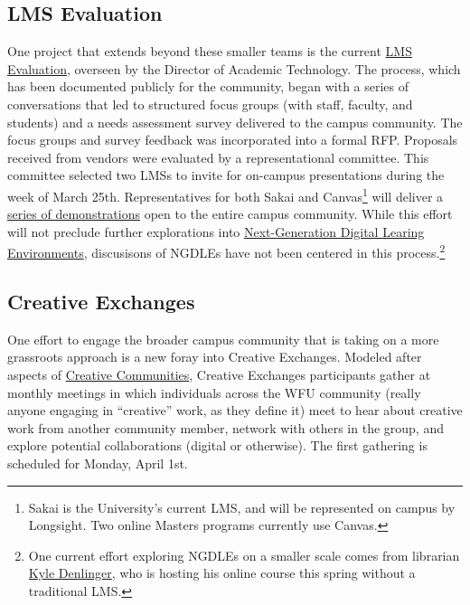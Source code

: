 \documentclass[]{tufte-handout}
\begin{document}
\subsection{LMS Evaluation}\label{lms-evaluation}

One project that extends beyond these smaller teams is the current
\href{https://is.wfu.edu/academic-technologies/lms-review/}{LMS
Evaluation}, overseen by the Director of Academic Technology. The
process, which has been documented publicly for the community, began
with a series of conversations that led to structured focus groups (with
staff, faculty, and students) and a needs assessment survey delivered to
the campus community. The focus groups and survey feedback was
incorporated into a formal RFP. Proposals received from vendors were
evaluated by a representational committee. This committee selected two
LMSs to invite for on-campus presentations during the week of March
25th. Representatives for both Sakai and Canvas\footnote{Sakai is the
  University's current LMS, and will be represented on campus by
  Longsight. Two online Masters programs currently use Canvas.} will
deliver a
\href{https://us18.campaign-archive.com/?e=\&u=bea1d79e7a99dd4ba1507c539\&id=dd32f72c28}{series
of demonstrations} open to the entire campus community. While this
effort will not preclude further explorations into
\href{https://er.educause.edu/articles/2017/7/the-ngdle-we-are-the-architects}{Next-Generation
Digital Learing Environments}, discusisons of NGDLEs have not been
centered in this process.\footnote{One current effort exploring NGDLEs
  on a smaller scale comes from librarian
  \href{https://zsr.wfu.edu/directory/kyle-denlinger/}{Kyle Denlinger},
  who is hosting his online course this spring without a traditional
  LMS.}

\subsection{Creative Exchanges}\label{creative-exchanges}

One effort to engage the broader campus community that is taking on a
more grassroots approach is a new foray into Creative Exchanges. Modeled
after aspects of \href{https://www.creativecommunities.group/}{Creative
Communities}, Creative Exchanges participants gather at monthly meetings
in which individuals across the WFU community (really anyone engaging in
``creative'' work, as they define it) meet to hear about creative work
from another community member, network with others in the group, and
explore potential collaborations (digital or otherwise). The first
gathering is scheduled for Monday, April 1st.
\end{document}
